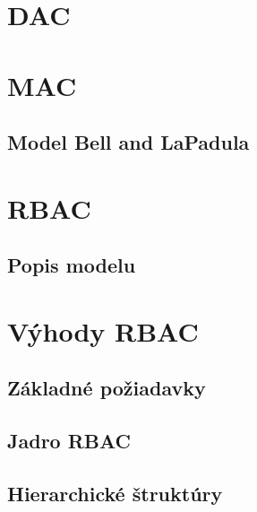 \section{DAC}


\section{MAC}
\subsection{Model Bell and LaPadula}


\section{RBAC}

\subsection{Popis modelu}

\section{Výhody RBAC}

\subsection{Základné požiadavky}

\subsection{Jadro RBAC}

\subsection{Hierarchické štruktúry}













	


